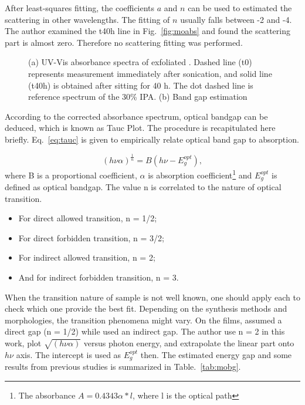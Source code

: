 After least-squares fitting, the coefficients $a$ and $n$ can be used to estimated the scattering in other wavelengths. The fitting of $n$ usually falls between -2 and -4. The author examined the t40h line in Fig.~\ref{fig:moabs} and found the scattering part is almost zero. Therefore no scattering fitting was performed.

\begin{figure}[htb]
\centering
{}\hspace{0.04\textwidth}
\caption[UV-Vis spectra of exfoliated ]{(a) UV-Vis absorbance spectra of exfoliated . Dashed line (t0) represents measurement immediately after sonication, and solid line (t40h) is obtained after sitting for 40 h. The dot dashed line is reference spectrum of the 30\% IPA. (b) Band gap estimation}
\label{fig:mouv}
\end{figure}

According to the corrected absorbance spectrum, optical bandgap can be deduced, which is known as Tauc Plot.\cite{Tauc1972} The procedure is recapitulated here briefly. Eq.~\ref{eq:tauc} is given to empirically relate optical band gap to absorption.

\begin{equation}\label{eq:tauc}
 (h\nu \alpha)^{\frac{1}{n}} = B(h\nu - E_g^{opt}),
\end{equation}
where B is a proportional coefficient, $\alpha$ is absorption coefficient\footnote{The absorbance $A = 0.4343\alpha*l$, where l is the optical path} and $E_g^{opt}$ is defined as optical bandgap. The value n is correlated to the nature of optical transition.
\begin{itemize}
\item For direct allowed transition, n = 1/2;
\item For direct forbidden transition, n = 3/2;
\item For indirect allowed transition, n = 2;
\item And for indirect forbidden transition, n = 3.
\end{itemize}

When the transition nature of sample is not well known, one should apply each to check which one provide the best fit. Depending on the synthesis methods and  morphologies, the transition phenomena might vary. On the  films, \citeauthor{Bouzidi2003} assumed a direct gap (n = 1/2)\cite{Bouzidi2003} while \citeauthor{Szekeres2002} used an indirect gap.\cite{Szekeres2002} The author use n = 2 in this work, plot $\sqrt{(h\nu \alpha)}$ versus photon energy, and extrapolate the linear part onto $h\nu$ axis. The intercept is used as $E_g^{opt}$ then. The estimated energy gap and some results from previous studies is summarized in Table.~\ref{tab:mobg}.

